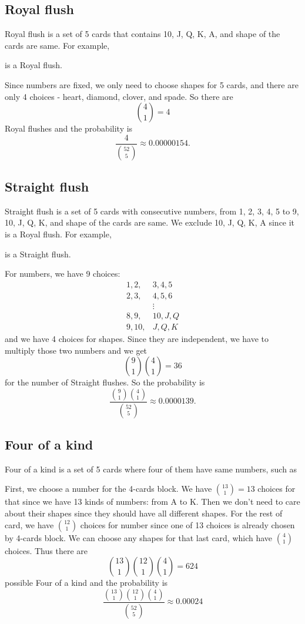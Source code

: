 \documentclass{article}
\begin{document}
\subsection*{Royal flush}

Royal flush is a set of 5 cards that contains 10, J, Q, K, A, and shape of the cards are same. For example, 
\begin{center}
{ \tend{} \Jd{} \Qd{} \Kd{} \Ad}
\end{center}
 is a Royal flush. 
 
Since numbers are fixed, we only need to choose shapes for 5 cards, and there are only 4 choices - heart, diamond, clover, and spade. So there are $$\binom{4}{1} = 4$$ Royal flushes and the probability is
$$
\frac{4}{\binom{52}{5}} \approx 0.00000154.
$$


\subsection*{Straight flush}
Straight flush is a set of 5 cards with consecutive numbers, from 1, 2, 3, 4, 5 to 9, 10, J, Q, K, and shape of the cards are same. We exclude 10, J, Q, K, A since it is a Royal flush. For example, 
\begin{center}
{ \treh{} \fourh{} \fiveh{} \sixh{} \sevh}
\end{center}
is a Straight flush. 

For numbers, we have 9 choices: 
\begin{align*}
1, 2, &3, 4, 5 \\
2, 3, &4, 5, 6 \\
&\vdots \\
8, 9, &10, J, Q \\
9, 10, &J, Q, K
\end{align*}
and we have 4 choices for shapes. Since they are independent, we have to multiply those two numbers and we get $$\binom{9}{1} \binom{4}{1}= 36$$ for the number of Straight flushes. 
So the probability is 
$$
\frac{\binom{9}{1}\binom{4}{1}}{\binom{52}{5}} \approx 0.0000139.
$$

\subsection*{Four of a kind}

Four of a kind is a set of 5 cards where four of them have same numbers, such as
\begin{center}
{ \fiveh{} \fived{} \fivec{} \fives{} \Jd}
\end{center}
First, we choose a number for the 4-cards block. We have $\binom{13}{1} = 13$ choices for that since we have 13 kinds of numbers: from A to K. Then we don't need to care about their shapes since they should have all different shapes. 
For the rest of card, we have $\binom{12}{1}$ choices for number since one of 13 choices is already chosen by 4-cards block. We can choose any shapes for that last card, which have $\binom{4}{1}$ choices. 
Thus there are
$$
\binom{13}{1}\binom{12}{1}\binom{4}{1} = 624
$$
possible Four of a kind and the probability is
$$
\frac{\binom{13}{1}\binom{12}{1}\binom{4}{1}}{\binom{52}{5}} \approx 0.00024
$$
\end{document}

